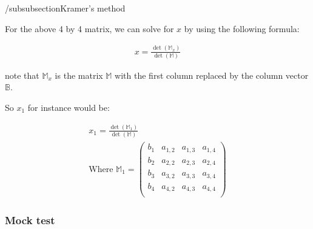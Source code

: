 \documentclass{article}
\begin{document}
/subsubsection{Kramer's method}

For the above 4 by 4 matrix, we can solve for $x$ by using the following formula:

\begin{align}
    x = \frac{\det(\mathbb{M}_x)}{\det(\mathbb{M})}
\end{align}

note that $\mathbb{M}_x$ is the matrix $\mathbb{M}$ with the first column replaced by the column vector $\mathbb{B}$.

So $ x_1 $ for instance would be:

\begin{align}
    x_1 = \frac{\det(\mathbb{M}_1)}{\det(\mathbb{M})} \\
    \textrm{Where } \mathbb{M}_1 =
    \begin{pmatrix}
        b_1 & a_{1,2} & a_{1,3} & a_{1,4} \\
        b_2 & a_{2,2} & a_{2,3} & a_{2,4} \\
        b_3 & a_{3,2} & a_{3,3} & a_{3,4} \\
        b_4 & a_{4,2} & a_{4,3} & a_{4,4} \\
    \end{pmatrix}
\end{align}

\subsubsection{Mock test}
\end{document}
